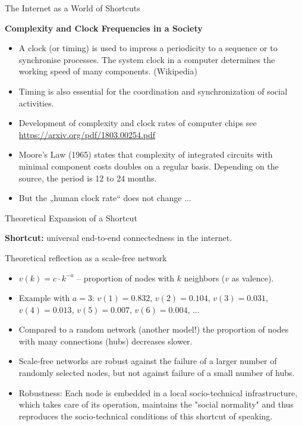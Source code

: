 \documentclass{beamer}
\newcommand{\ueberschrift}[1]{\begin{center}\bf #1\end{center}}
\begin{document}
\begin{frame}{The Internet as a World of Shortcuts}
\ueberschrift{Complexity and Clock Frequencies in a Society}
\begin{itemize}
\item A clock (or timing) is used to impress a periodicity to a sequence or to
  synchronise processes. The system clock in a computer determines the working
  speed of many components. (Wikipedia)
\item Timing is also essential for the coordination and synchronization of
  social activities.
\item Development of complexity and clock rates of computer chips see
  \url{https://arxiv.org/pdf/1803.00254.pdf}
\item Moore's Law (1965) states that complexity of integrated circuits with
  minimal component costs doubles on a regular basis. Depending on the source,
  the period is 12 to 24 months.
\item But the „human clock rate“ does not change ...
\end{itemize}\vspace*{2em}
\end{frame}

\begin{frame}{Theoretical Expansion of a Shortcut}

  \textbf{Shortcut:} universal end-to-end connectedness in the internet.

  Theoretical reflection as a scale-free network\small
\begin{itemize}
\item $v(k)=c\cdot k^{-a}$ -- proportion of nodes with $k$ neighbors ($v$ as
  valence). \item Example with $a=3$: $v(1)=0.832$, $v(2)=0.104$,
  $v(3)=0.031$, $v(4)=0.013$, $v(5)=0.007$, $v(6)=0.004$, ...
\item Compared to a random network (another model!) the proportion of
  nodes with many connections (hubs) decreases slower.
\item Scale-free networks are robust against the failure of a larger number of
  randomly selected nodes, but not against failure of a small number of hubs.
\item Robustness: Each node is embedded in a local socio-technical
  infrastructure, which takes care of its operation, maintains the "social
  normality" and thus reproduces the socio-technical conditions of this
  shortcut of speaking.
\end{itemize}\bigskip
\end{frame}
\end{document}
